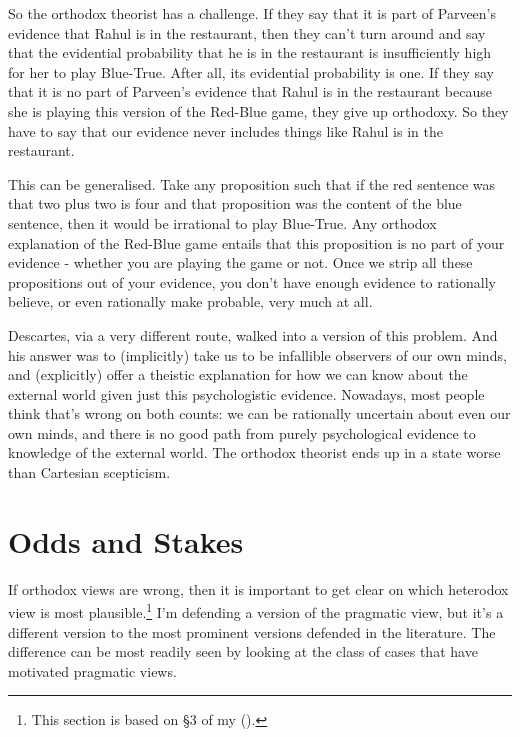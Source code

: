 \documentclass[
  12pt,
  letterpaper,
]{scrbook}
\begin{document}
So the orthodox theorist has a challenge. If they say that it is part of
Parveen's evidence that Rahul is in the restaurant, then they can't turn
around and say that the evidential probability that he is in the
restaurant is insufficiently high for her to play Blue-True. After all,
its evidential probability is one. If they say that it is no part of
Parveen's evidence that Rahul is in the restaurant because she is
playing this version of the Red-Blue game, they give up orthodoxy. So
they have to say that our evidence never includes things like Rahul is
in the restaurant.

This can be generalised. Take any proposition such that if the red
sentence was that two plus two is four and that proposition was the
content of the blue sentence, then it would be irrational to play
Blue-True. Any orthodox explanation of the Red-Blue game entails that
this proposition is no part of your evidence - whether you are playing
the game or not. Once we strip all these propositions out of your
evidence, you don't have enough evidence to rationally believe, or even
rationally make probable, very much at all.

Descartes, via a very different route, walked into a version of this
problem. And his answer was to (implicitly) take us to be infallible
observers of our own minds, and (explicitly) offer a theistic
explanation for how we can know about the external world given just this
psychologistic evidence. Nowadays, most people think that's wrong on
both counts: we can be rationally uncertain about even our own minds,
and there is no good path from purely psychological evidence to
knowledge of the external world. The orthodox theorist ends up in a
state worse than Cartesian scepticism.

\section{Odds and Stakes}\label{sec-oddsandstakes}

If orthodox views are wrong, then it is important to get clear on which
heterodox view is most plausible.\footnote{This section is based on §3
  of my ().} I'm defending a version
of the pragmatic view, but it's a different version to the most
prominent versions defended in the literature. The difference can be
most readily seen by looking at the class of cases that have motivated
pragmatic views.
\end{document}
